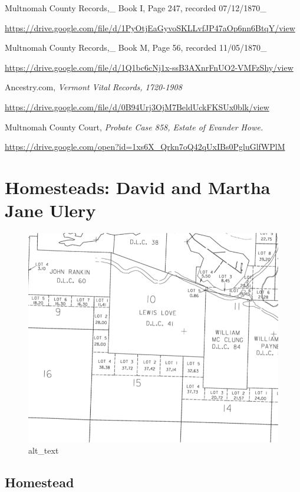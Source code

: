 \documentclass[
  12pt,
]{book}
\begin{document}
Multnomah County Records,\_ Book I, Page 247, recorded 07/12/1870\_

\url{https://drive.google.com/file/d/1PyOtjEaGyvoSKLLvfJP47aOp6nn6BtqY/view}

Multnomah County Records,\_ Book M, Page 56, recorded 11/05/1870\_

\url{https://drive.google.com/file/d/1Q1bc6cNj1x-ssB3AXnrFnUO2-VMFzShy/view}

Ancestry.com, \emph{Vermont Vital Records, 1720-1908}

\url{https://drive.google.com/file/d/0B94Urj3OjM7BeldUckFKSUx0blk/view}

Multnomah County Court, \emph{Probate Case 858, Estate of Evander Howe.}

\url{https://drive.google.com/open?id=1xs6X_Qrkn7oQ42qUxIBs0PgluGlfWPlM}

\hypertarget{homesteads-david-and-martha-jane-ulery}{%
\section{Homesteads: David and Martha Jane Ulery}\label{homesteads-david-and-martha-jane-ulery}}

\begin{figure}
\centering
\includegraphics{images/0202a_images/image1.png}
\caption{alt\_text}
\end{figure}

\hypertarget{homestead-1}{%
\subsection{Homestead}\label{homestead-1}}
\end{document}
